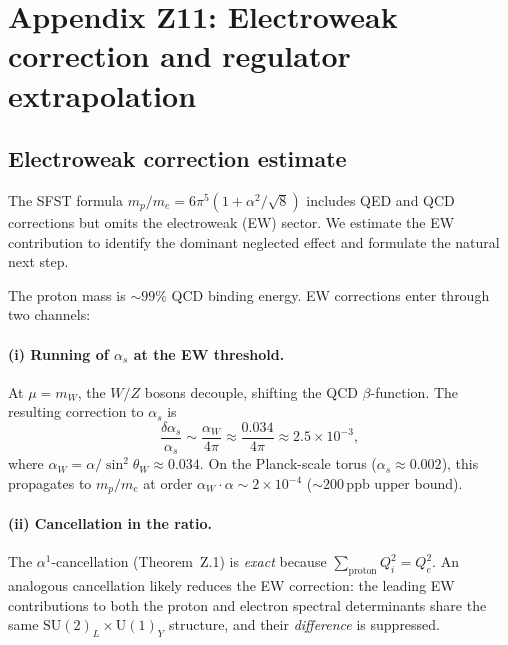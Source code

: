 
\section{Appendix Z11: Electroweak correction and regulator extrapolation}
\label{app:ew_regulator}

\subsection{Electroweak correction estimate}

The SFST formula $m_p/m_e=6\pi^5(1+\alpha^2/\!\sqrt{8})$ includes QED
and QCD corrections but omits the electroweak (EW) sector.  We estimate
the EW contribution to identify the dominant neglected effect and
formulate the natural next step.

The proton mass is $\sim\!99\%$ QCD binding energy.  EW corrections
enter through two channels:

\paragraph{(i) Running of $\alpha_s$ at the EW threshold.}
At $\mu=m_W$, the $W/Z$ bosons decouple, shifting the QCD $\beta$-function.
The resulting correction to $\alpha_s$ is
\begin{equation}\label{eq:ew_alphas}
  \frac{\delta\alpha_s}{\alpha_s}
  \sim \frac{\alpha_W}{4\pi}
  \approx \frac{0.034}{4\pi}
  \approx 2.5\times 10^{-3},
\end{equation}
where $\alpha_W = \alpha/\sin^2\!\theta_W \approx 0.034$.
On the Planck-scale torus ($\alpha_s\approx 0.002$), this propagates to
$m_p/m_e$ at order $\alpha_W\cdot\alpha\sim 2\times 10^{-4}$
($\sim\!200\,$ppb upper bound).

\paragraph{(ii) Cancellation in the ratio.}
The $\alpha^1$-cancellation (Theorem~Z.1) is \emph{exact} because
$\sum_{\mathrm{proton}}Q_i^2 = Q_e^2$.  An analogous cancellation
likely reduces the EW correction: the leading EW contributions to
both the proton and electron spectral determinants share the same
$\mathrm{SU}(2)_L\times\mathrm{U}(1)_Y$ structure, and their
\emph{difference} is suppressed.

